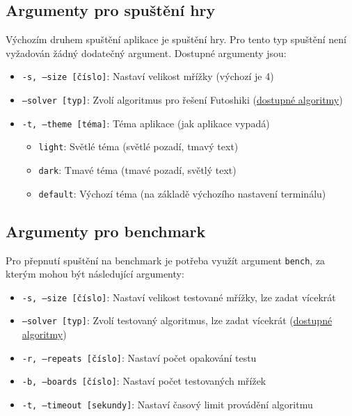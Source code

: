 \subsection*{Argumenty pro spuštění hry}

Výchozím druhem spuštění aplikace je spuštění hry. Pro tento typ spuštění není
vyžadován žádný dodatečný argument. Dostupné argumenty jsou:

\begin{itemize}
    \item \texttt{-s, --size [číslo]}: Nastaví velikost mřížky (výchozí je 4)
    \item \texttt{--solver [typ]}: Zvolí algoritmus pro řešení Futoshiki
        (\hyperref[sec:argsAlgs]{dostupné algoritmy})
    \item \texttt{-t, --theme [téma]}: Téma aplikace (jak aplikace vypadá)
    \begin{itemize}
        \item \texttt{light}: Světlé téma (světlé pozadí, tmavý text)
        \item \texttt{dark}: Tmavé téma (tmavé pozadí, světlý text)
        \item \texttt{default}: Výchozí téma (na základě výchozího nastavení
            terminálu)
    \end{itemize}
\end{itemize}

\subsection*{Argumenty pro benchmark}

Pro přepnutí spuštění na benchmark je potřeba využít argument \texttt{bench},
za kterým mohou být následující argumenty:

\begin{itemize}
    \item \texttt{-s, --size [číslo]}: Nastaví velikost testované mřížky, lze
        zadat vícekrát
    \item \texttt{--solver [typ]}: Zvolí testovaný algoritmus, lze zadat
        vícekrát (\hyperref[sec:argsAlgs]{dostupné algoritmy})
    \item \texttt{-r, --repeats [číslo]}: Nastaví počet opakování testu
    \item \texttt{-b, --boards [číslo]}: Nastaví počet testovaných mřížek
    \item \texttt{-t, --timeout [sekundy]}: Nastaví časový limit provádění
        algoritmu
\end{itemize}

